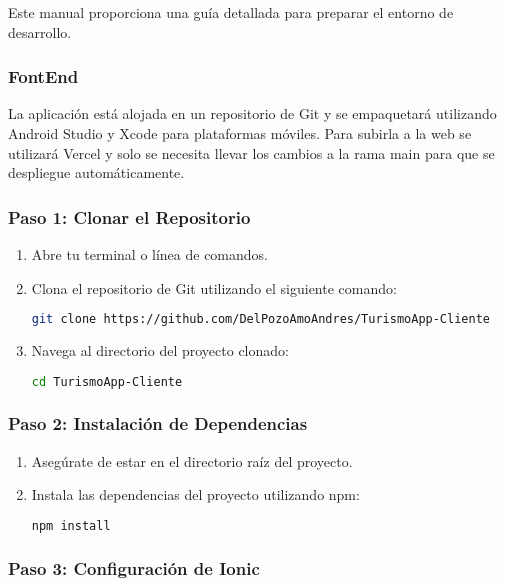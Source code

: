 Este manual proporciona una guía detallada para preparar el entorno de desarrollo.

\subsubsection{FontEnd}

La aplicación está alojada en un repositorio de Git y se empaquetará utilizando Android Studio y Xcode para plataformas móviles.
Para subirla a la web se utilizará Vercel y solo se necesita llevar los cambios a la rama main para que se despliegue automáticamente.

\subsubsection{Paso 1: Clonar el Repositorio}

\begin{enumerate}
	\item Abre tu terminal o línea de comandos.
	\item Clona el repositorio de Git utilizando el siguiente comando:
	      \begin{lstlisting}[language=bash]
    git clone https://github.com/DelPozoAmoAndres/TurismoApp-Cliente
    \end{lstlisting}
	\item Navega al directorio del proyecto clonado:
	      \begin{lstlisting}[language=bash]
    cd TurismoApp-Cliente
    \end{lstlisting}
\end{enumerate}

\subsubsection{Paso 2: Instalación de Dependencias}

\begin{enumerate}
	\item Asegúrate de estar en el directorio raíz del proyecto.
	\item Instala las dependencias del proyecto utilizando npm:
	      \begin{lstlisting}[language=bash]
    npm install
    \end{lstlisting}
\end{enumerate}

\subsubsection{Paso 3: Configuración de Ionic}

